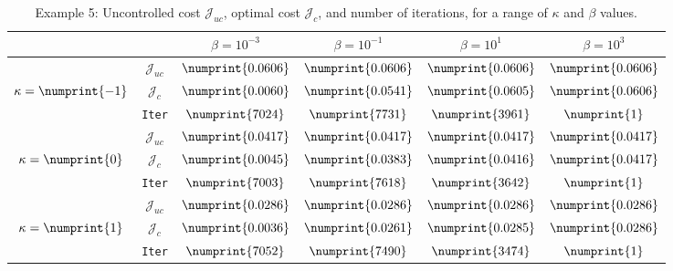 \begin{table}
\begin{tabular}{ | c | c || c | c | c | c ||}
\hline
\multicolumn{2}{|c||}{}& $\beta = 10^{-3}$ & $\beta = 10^{-1}$ & $\beta = 10^{1}$ & $\beta = 10^{3}$  \\
\hline
\hline
 & $\mathcal{J}_{uc}$ & $\numprint{0.0606}$ & $\numprint{0.0606}$ & $\numprint{0.0606}$ & $\numprint{0.0606}$ \\
$\kappa= \numprint{-1}$  & $\mathcal{J}_c$ & $\numprint{0.0060}$ & $\numprint{0.0541}$ & $\numprint{0.0605}$ & $\numprint{0.0606}$ \\
& \texttt{Iter} & $\numprint{7024}$ & $\numprint{7731}$ & $\numprint{3961}$ & $\numprint{1}$ \\
\hline
 & $\mathcal{J}_{uc}$ & $\numprint{0.0417}$ & $\numprint{0.0417}$ & $\numprint{0.0417}$ & $\numprint{0.0417}$ \\
$\kappa= \numprint{0}$  & $\mathcal{J}_c$ & $\numprint{0.0045}$ & $\numprint{0.0383}$ & $\numprint{0.0416}$ & $\numprint{0.0417}$ \\
& \texttt{Iter} & $\numprint{7003}$ & $\numprint{7618}$ & $\numprint{3642}$ & $\numprint{1}$ \\
\hline
 & $\mathcal{J}_{uc}$ & $\numprint{0.0286}$ & $\numprint{0.0286}$ & $\numprint{0.0286}$ & $\numprint{0.0286}$ \\
$\kappa= \numprint{1}$  & $\mathcal{J}_c$ & $\numprint{0.0036}$ & $\numprint{0.0261}$ & $\numprint{0.0285}$ & $\numprint{0.0286}$ \\
& \texttt{Iter} & $\numprint{7052}$ & $\numprint{7490}$ & $\numprint{3474}$ & $\numprint{1}$ \\
\hline
\end{tabular}
\caption{Example 5: Uncontrolled cost $\mathcal{J}_{uc}$, optimal cost $\mathcal{J}_{c}$, and number of iterations, for a range of $\kappa$ and $\beta$ values.}
\label{TabS5:Prob5}
\end{table}